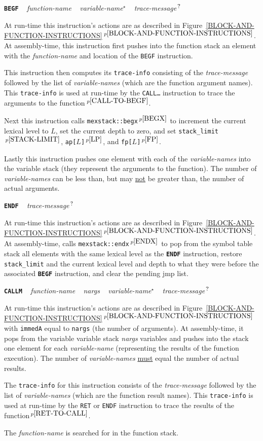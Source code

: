 \documentclass[12pt]{article}
\makeatletter
\newcommand{\TT}[1]{{\tt \bfseries #1}}
\newcommand{\STAR}{{\Large $^\star$}}
\newcommand{\QMARK}{{$^{\,\mbox{\footnotesize ?}}$}}
\newcommand{\ttkey}[1]{\TT{#1}\index{#1@{\tt #1}}}
\newcommand{\itemref}[1]{\ref{#1}$\,^{p\pageref{#1}}$}
\newcommand{\pagnote}[1]{$\,^{p\pageref{#1}}$}
\newenvironment{indpar}[1][0.3in]%
	{\begin{list}{}%
		     {\setlength{\itemsep}{0in}%
		      \setlength{\topsep}{0in}%
		      \setlength{\parsep}{1ex}%
		      \setlength{\labelwidth}{#1}%
		      \setlength{\leftmargin}{#1}%
		      \addtolength{\leftmargin}{\labelsep}}%
	 \item}%
	{\end{list}}
\makeatother
\begin{document}
\ttkey{BEGF}\label{BEGF} ~ {\em function-name} ~ {\em variable-name}\STAR{} ~
	{\em trace-message}\QMARK{}
\begin{indpar}
At run-time this instruction's actions are as described in
Figure~\itemref{BLOCK-AND-FUNCTION-INSTRUCTIONS}.  At assembly-time,
this instruction first pushes into the function stack
an element with the {\em function-name} and location of the {\tt BEGF}
instruction.

This instruction then computes its {\tt trace-info}
consisting of the {\em trace-message} followed by the list of
{\em variable-names} (which are the function argument names).
This {\tt trace-info} is used at run-time by the
{\tt CALL\ldots} instruction to trace the arguments
to the function\pagnote{CALL-TO-BEGF}.

Next this instruction calls {\tt mexstack::begx}\pagnote{BEGX}
to increment the current lexical level to $L$, set the current depth to zero,
and set {\tt stack\_limit}\pagnote{STACK-LIMIT},
{\tt ap[$L$]}\pagnote{LP}, and {\tt fp[$L$]}\pagnote{FP}.

Lastly this instruction pushes one element with each
of the {\em variable-names} into the variable stack (they
represent the arguments to the function).
The number of {\em variable-names} can be less than,
but may \underline{not} be greater than, the number of actual
arguments.
\end{indpar}

\ttkey{ENDF} ~ {\em trace-message}\QMARK{}
\begin{indpar}
At run-time this instruction's actions are as described in
Figure~\itemref{BLOCK-AND-FUNCTION-INSTRUCTIONS}.
At assembly-time,
calls {\tt mexstack::endx}\pagnote{ENDX} to
pop from the symbol table stack all elements with the
same lexical level as the \TT{ENDF} instruction,
restore 
{\tt stack\_limit} and
the current lexical level and depth to what they were before
the associated \TT{BEGF} instruction, and clear the pending jmp list.
\end{indpar}

\ttkey{CALLM} ~ {\em function-name} ~ {\em nargs} ~
        {\em variable-name}\STAR{} ~ {\em trace-message}\QMARK{}
\begin{indpar}
At run-time this instruction's actions are as described in
Figure~\itemref{BLOCK-AND-FUNCTION-INSTRUCTIONS} with {\tt immedA} equal to
{\tt nargs} (the number of arguments).  At assembly-time,
it pops from the variable variable stack {\em nargs} variables
and pushes into the stack one element for each {\em variable-name}
(representing the results of the function execution).
The number of {\em variable-names} \underline{must} equal
the number of actual results.

The {\tt trace-info} for this instruction
consists of the {\em trace-message} followed by the list of
{\em variable-names} (which are the function result names).
This {\tt trace-info} is used at run-time by the
{\tt RET} or {\tt ENDF} instruction to trace the results
of the function\pagnote{RET-TO-CALL}.

The {\em function-name} is searched for in the function stack.
\end{indpar}
\end{document}
